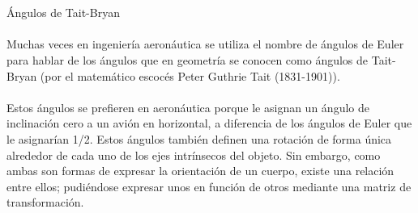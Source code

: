 \documentclass[12pt,a4paper]{article}
\begin{document}
\\\\
Ángulos de Tait-Bryan
\\\\
Muchas veces en ingeniería aeronáutica se utiliza el nombre de ángulos de Euler para hablar de los ángulos que en geometría se conocen como ángulos de Tait-Bryan (por el matemático escocés Peter Guthrie Tait (1831-1901)).
\\\\Estos ángulos se prefieren en aeronáutica porque le asignan un ángulo de inclinación cero a un avión en horizontal, a diferencia de los ángulos de Euler que le asignarían 1/2. Estos ángulos también definen una rotación de forma única alrededor de cada uno de los ejes intrínsecos del objeto. Sin embargo, como ambas son formas de expresar la orientación de un cuerpo, existe una relación entre ellos; pudiéndose expresar unos en función de otros mediante una matriz de transformación.
\end{document}
